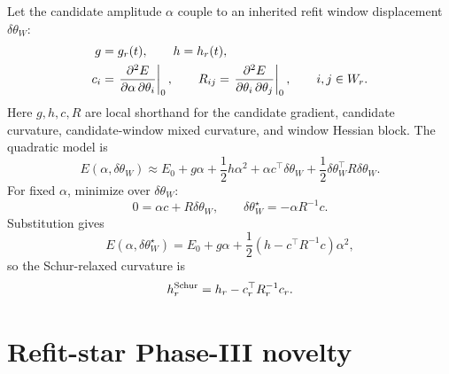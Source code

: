 \documentclass[10pt,twocolumn]{article}
\begin{document}
Let the candidate amplitude \(\alpha\) couple to an inherited refit window displacement \(\delta\theta_W\):
\begin{align}
g&=g_r(t),
\qquad
h=h_r(t),
\notag\\
c_i&=\left.\frac{\partial^2 E}{\partial\alpha\,\partial\theta_i}\right|_0,
\qquad
R_{ij}=\left.\frac{\partial^2 E}{\partial\theta_i\,\partial\theta_j}\right|_0,
\qquad i,j\in W_r .
\label{eq:p1_schur_coefficients}
\end{align}
Here \(g,h,c,R\) are local shorthand for the candidate gradient, candidate curvature, candidate-window mixed curvature, and window Hessian block. The quadratic model is
\begin{equation}
E(\alpha,\delta\theta_W)
\approx E_0+g\alpha+\frac12h\alpha^2
+\alpha c^\top\delta\theta_W
+\frac12\delta\theta_W^\top R\delta\theta_W.
\label{eq:p1_quad_model}
\end{equation}
For fixed \(\alpha\), minimize over \(\delta\theta_W\):
\begin{equation}
0=\alpha c+R\delta\theta_W,
\qquad
\delta\theta_W^\star=-\alpha R^{-1}c.
\label{eq:p1_window_star}
\end{equation}
Substitution gives
\begin{equation}
E(\alpha,\delta\theta_W^\star)
=E_0+g\alpha+\frac12\left(h-c^\top R^{-1}c\right)\alpha^2,
\label{eq:p1_schur_substitute}
\end{equation}
so the Schur-relaxed curvature is
\begin{equation}
h_r^{\rm Schur}=h_r-c_r^\top R_r^{-1}c_r.
\label{eq:p1_h_schur}
\end{equation}

\section{Refit-star Phase-III novelty}
\end{document}
